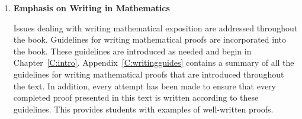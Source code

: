 \begin{enumerate}
\item \textbf{Emphasis on Writing in Mathematics}

Issues dealing with writing mathematical exposition are addressed throughout the book.  Guidelines for writing mathematical proofs are incorporated into the book.  These guidelines are introduced as needed and begin in Chapter~\ref{C:intro}.  Appendix~\ref{C:writingguides} contains a summary of all the guidelines for writing mathematical proofs that are introduced throughout the text.  In addition, every attempt has been made to ensure that every completed proof presented in this text is written according to these guidelines.  This provides students with examples of well-written proofs.

%


\end{enumerate}
